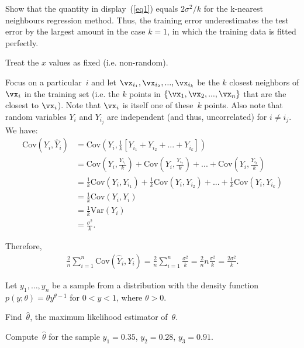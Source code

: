 \documentclass[12pt, answers]{exam}
\def\var{\text{Var}}
\def\cov{\text{Cov}}
\def\({\left(}
\def\){\right)}
\begin{document}
\begin{questions}
\medskip


Show that the quantity in display~(\ref{eq1}) equals $2\sigma^2/k$ for the k-nearest neighbours regression method. Thus, the training error underestimates the test error by the largest amount in the case $k=1$, in which the training data is fitted perfectly.

Treat the $x$ values as fixed (i.e. non-random).   \vspace{12pt}

\begin{solution}
Focus on a particular~$i$ and let $\vx_{i_1},\vx_{i_2},...,\vx_{i_k}$ be the $k$ closest neighbors of $\vx_i$ in the training set (i.e. the $k$ points in $\{\vx_1,\vx_2,...,\vx_n\}$ that are the closest to $\vx_i$).  Note that $\vx_i$ is itself one of these~$k$ points.  Also note that random variables $Y_i$ and $Y_{i_j}$ are independent (and thus, uncorrelated) for $i\ne i_j$.  We have:
\begin{align*}
\cov(Y_i, \widehat{Y}_i)&=\cov\(Y_i, \frac1k[Y_{i_1}+Y_{i_2}+...+Y_{i_k}] \)\\
&=\cov\(Y_i, \frac{Y_{i_1}}k\)+\cov\(Y_i, \frac{Y_{i_2}}k\)+...+\cov\(Y_i, \frac{Y_{i_k}}k\)\\
&=\frac1k\cov\(Y_i, {Y_{i_1}}\)+\frac1k\cov\(Y_i, {Y_{i_2}}\)+...+\frac1k\cov\(Y_i, {Y_{i_k}}\)\\
&=\frac1k\cov\(Y_i, Y_i\)\\
&=\frac1k\var\(Y_i\)\\
&=\frac{\sigma^2}k.
\end{align*}

\medskip

Therefore,
\begin{align*}
\frac{2}{n}\sum_{i=1}^{n}\cov(\widehat{Y}_i,Y_i)=\frac{2}{n}\sum_{i=1}^{n}\frac{\sigma^2}k = \frac{2}{n} n\frac{\sigma^2}k= \frac{2\sigma^2}k.
\end{align*}

\end{solution}


\bigskip
\medskip

\question

Let $y_1,\ldots,y_n$ be a sample from a distribution with the density function $p(y;\theta)=\theta y^{\theta-1}$ for $0<y<1$, where $\theta>0$.

Find~$\widehat{\theta}$, the maximum likelihood estimator of~$\theta$.

Compute~$\widehat{\theta}$ for the sample $y_1=0.35$, $y_2=0.28$, $y_3=0.91$.


\end{questions}
\end{document}
